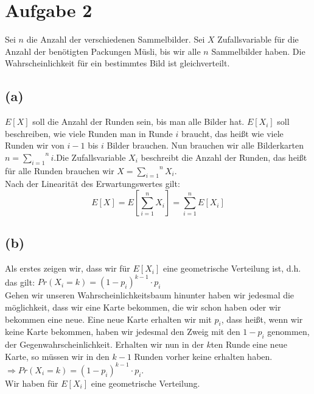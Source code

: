\documentclass[11pt,a4paper,ngerman]{article}
\begin{document}

\section*{Aufgabe 2}

Sei $n$ die Anzahl der verschiedenen Sammelbilder. Sei $X$ Zufallsvariable für die Anzahl der benötigten Packungen Müsli, bis wir alle $n$ Sammelbilder haben. Die Wahrscheinlichkeit für ein bestimmtes Bild ist gleichverteilt.


\subsection*{(a)}

$E[X]$ soll die Anzahl der Runden sein, bis man alle Bilder hat. $E[ X_i ]$ soll beschreiben, wie viele Runden man in Runde $i$ braucht, das heißt wie viele Runden wir von $i-1$ bis $i$ Bilder brauchen. Nun brauchen wir alle Bilderkarten $n = \overset{n}{\underset{i=1}{\sum}} i$.Die Zufallsvariable $X_i$ beschreibt die Anzahl der Runden, das heißt für alle Runden brauchen wir $X = \overset{n}{\underset{i=1}{\sum}} X_i$.\\
Nach der Linearität des Erwartungswertes gilt:\\
$$E[ X ] = E \left[ \sum_{i=1}^{n} X_i \right] = \sum_{i=1}^{n} E[ X_i ]$$




\subsection*{(b)}

Als erstes zeigen wir, dass wir für $E[X_i]$ eine geometrische Verteilung ist, d.h. das gilt:
$Pr(X_i = k) = (1 - p_i)^{k-1}\cdot p_i$ \\

Gehen wir unseren Wahrscheinlichkeitsbaum hinunter haben wir jedesmal die möglichkeit, dass wir eine Karte bekommen, die wir schon haben oder wir bekommen eine neue. Eine neue Karte erhalten wir mit $p_i$, dass heißt, wenn wir keine Karte bekommen, haben wir jedesmal den Zweig mit den $1-p_i$ genommen, der Gegenwahrscheinlichkeit. Erhalten wir nun in der $k$ten Runde eine neue Karte, so müssen wir in den $k-1$ Runden vorher keine erhalten haben. $\Rightarrow Pr(X_i = k) = (1-p_i)^{k-1} \cdot p_i$.\\
Wir haben für $E[X_i]$ eine geometrische Verteilung.
\end{document}
